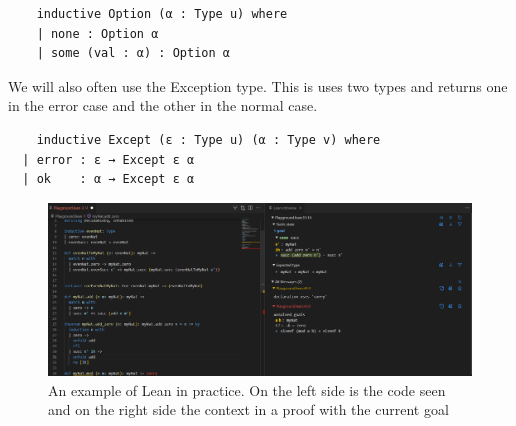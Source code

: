 \begin{lstlisting}
    inductive Option (α : Type u) where
    | none : Option α
    | some (val : α) : Option α
\end{lstlisting}

We will also often use the Exception type. This is uses two types and returns one in the error case and the other in the normal case.

\begin{lstlisting}
    inductive Except (ε : Type u) (α : Type v) where
  | error : ε → Except ε α
  | ok    : α → Except ε α
\end{lstlisting}

\begin{figure}
    \centering
    \includegraphics[scale=0.25]{Lean_example.png}
    \caption{An example of Lean in practice. On the left side is the code seen and on the right side the context in a proof with the current goal}
\end{figure}
